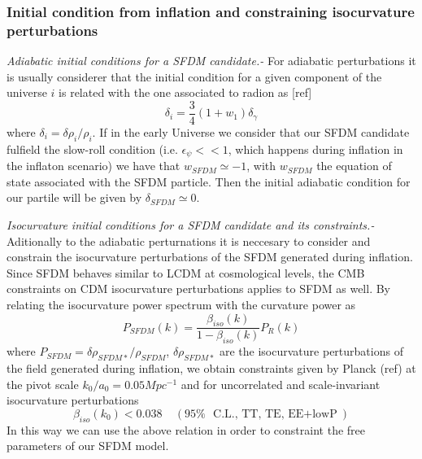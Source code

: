 \documentclass[twocolumn,           %
               showpacs,            %
               preprintnumbers,     %
               aps,                 %
               prl,          	    %
               letterpaper,             %
               superscriptaddress,      %
               nofootinbib,         %
               tightenlines,        %
               floats,floatfix      %
               ,usenatbib,
               ]{revtex4-1}
\begin{document}
\subsubsection{Initial condition from inflation and constraining isocurvature perturbations}
\textit{Adiabatic initial conditions for a SFDM candidate.-} For adiabatic perturbations it is usually considerer that the initial condition for a given component of the universe $i$ is related with the one associated to radion as [ref]
\begin{equation}
\delta_i = \frac{3}{4}(1+w_1)\delta_\gamma
\end{equation}
where $\delta_i = \delta\rho_i/\rho_i$. If in the early Universe we consider that our SFDM candidate fulfield the slow-roll condition (i.e. $\epsilon_\psi<<1$, which happens during inflation in the inflaton scenario) we have that $w_{SFDM}\simeq -1$, with $w_{SFDM}$ the equation of state associated with the SFDM particle. Then the initial adiabatic condition for our partile will be given by $\delta_{SFDM}\simeq 0$.

\textit{Isocurvature initial conditions for a SFDM candidate and its constraints.-} Aditionally to the adiabatic perturnations it is neccesary to consider and constrain the isocurvature perturbations of the SFDM generated during inflation. 
Since SFDM behaves similar to LCDM at cosmological levels, the CMB constraints on CDM isocurvature perturbations applies to SFDM as well. By relating the isocurvature power spectrum with the curvature power as
\begin{equation}
P_{SFDM}(k)=\frac{\beta_{iso}(k)}{1-\beta_{iso}(k)}P_R(k)
\end{equation}
where $P_{SFDM}=\delta\rho_{SFDM*}/\rho_{SFDM}$, $\delta\rho_{SFDM*}$ are the isocurvature perturbations of the field generated during inflation, we obtain constraints given by Planck (ref) at the pivot scale $k_0/a_0=0.05Mpc^{-1}$ and for uncorrelated and scale-invariant isocurvature perturbations 
\begin{equation}
\beta_{iso}(k_0)<0.038 \ \ \ \ \ (95\%\ \ \text{C.L., TT, TE, EE$+$lowP})
\end{equation}
In this way we can use the above relation in order to constraint the free parameters of our SFDM model.
\end{document}
